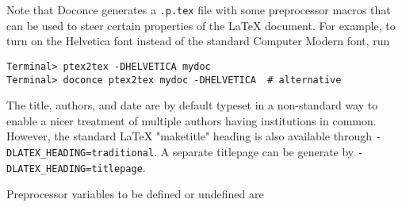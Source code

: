 \documentclass[%
oneside,                 %
final,                   %
10pt]{article}
\begin{document}
Note that Doconce generates a {\fontsize{10pt}{10pt}\Verb!.p.tex!} file with some preprocessor macros
that can be used to steer certain properties of the {\LaTeX} document.
For example, to turn on the Helvetica font instead of the standard
Computer Modern font, run
\vspace{4pt}
\begin{Verbatim}[numbers=none,frame=lines,label=\fbox{{\tiny Terminal}},fontsize=\fontsize{9pt}{9pt},
labelposition=topline,framesep=2.5mm,framerule=0.7pt]
Terminal> ptex2tex -DHELVETICA mydoc
Terminal> doconce ptex2tex mydoc -DHELVETICA  # alternative
\end{Verbatim}
The title, authors, and date are by default typeset in a non-standard
way to enable a nicer treatment of multiple authors having
institutions in common. However, the standard {\LaTeX} "maketitle" heading
is also available through {\fontsize{10pt}{10pt}\Verb!-DLATEX_HEADING=traditional!}.
A separate titlepage can be generate by
{\fontsize{10pt}{10pt}\Verb!-DLATEX_HEADING=titlepage!}.

Preprocessor variables to be defined or undefined are
\end{document}
